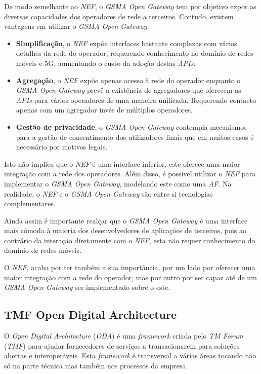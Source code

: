 De modo semelhante ao \emph{NEF}, o \emph{GSMA Open Gateway} tem por objetivo
expor as diversas capacidades dos operadores de rede a terceiros. 
Contudo, existem vantagens em utilizar o \emph{GSMA Open Gateway}:

\begin{itemize}
	\item \textbf{Simplificação}, o \emph{NEF} expõe interfaces bastante
	      complexas com vários detalhes da rede do operador, requerendo
	      conhecimento no domínio de redes móveis e 5G, aumentando o custo da
	      adoção destas \emph{APIs}.
	\item \textbf{Agregação}, o \emph{NEF} expõe apenas acesso à rede do
	      operador enquanto o \emph{GSMA Open Gateway} prevê a existência de
	      agregadores que oferecem as \emph{APIs} para vários operadores de uma
	      maneira unificada. Requerendo contacto apenas com um agregador invés de
	      múltiplos operadores.
	\item \textbf{Gestão de privacidade}, o \emph{GSMA Open Gateway}
	      contempla mecanismos para a gestão de consentimento dos utilizadores
	      finais que em muitos casos é necessário por motivos legais.
\end{itemize}

Isto não implica que o \emph{NEF} é uma interface inferior, este oferece uma
maior integração com a rede dos operadores. Além disso, é possível utilizar o
\emph{NEF} para implementar o \emph{GSMA Open Gateway}, modelando este como uma
\emph{AF}. Na realidade, o \emph{NEF} e o \emph{GSMA Open Gateway} são entre si tecnologias
complementares. 

Ainda assim é importante realçar que o \emph{GSMA Open Gateway} é uma interface mais cómoda à maioria
dos desenvolvedores de aplicações de terceiros, pois ao contrário da interação
diretamente com o \emph{NEF}, esta não requer conhecimento do
domínio de redes móveis. 

O \emph{NEF}, acaba por ter também a sua importância, por um lado por oferecer uma maior
integração com a rede do operador, mas por outro por ser capaz até de um \emph{GSMA Open Gateway} ser
implementado sobre o este.

\subsection{TMF Open Digital Architecture}

O \emph{Open Digital Architecture} (\emph{ODA}) é uma \emph{framework} criada
pelo \emph{TM Forum} (\emph{TMF}) para ajudar fornecedores de serviços a
transacionarem para soluções abertas e interoperáveis. Esta \emph{framework} é
transversal a várias áreas tocando não só na parte técnica mas também nos
processos da empresa.

